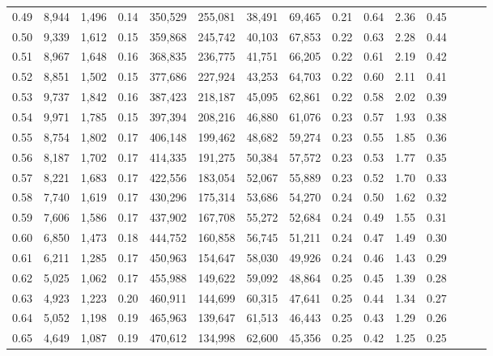 \begin{tabular}{rrrrrrrrrrrrrrr}
0.49 &   8,944 &  1,496 &  0.14 &  350,529 &  255,081 &   38,491 &   69,465 &  0.21 &  0.64 &  2.36 &      0.45 \\
0.50 &   9,339 &  1,612 &  0.15 &  359,868 &  245,742 &   40,103 &   67,853 &  0.22 &  0.63 &  2.28 &      0.44 \\
0.51 &   8,967 &  1,648 &  0.16 &  368,835 &  236,775 &   41,751 &   66,205 &  0.22 &  0.61 &  2.19 &      0.42 \\
0.52 &   8,851 &  1,502 &  0.15 &  377,686 &  227,924 &   43,253 &   64,703 &  0.22 &  0.60 &  2.11 &      0.41 \\
0.53 &   9,737 &  1,842 &  0.16 &  387,423 &  218,187 &   45,095 &   62,861 &  0.22 &  0.58 &  2.02 &      0.39 \\
0.54 &   9,971 &  1,785 &  0.15 &  397,394 &  208,216 &   46,880 &   61,076 &  0.23 &  0.57 &  1.93 &      0.38 \\
0.55 &   8,754 &  1,802 &  0.17 &  406,148 &  199,462 &   48,682 &   59,274 &  0.23 &  0.55 &  1.85 &      0.36 \\
0.56 &   8,187 &  1,702 &  0.17 &  414,335 &  191,275 &   50,384 &   57,572 &  0.23 &  0.53 &  1.77 &      0.35 \\
0.57 &   8,221 &  1,683 &  0.17 &  422,556 &  183,054 &   52,067 &   55,889 &  0.23 &  0.52 &  1.70 &      0.33 \\
0.58 &   7,740 &  1,619 &  0.17 &  430,296 &  175,314 &   53,686 &   54,270 &  0.24 &  0.50 &  1.62 &      0.32 \\
0.59 &   7,606 &  1,586 &  0.17 &  437,902 &  167,708 &   55,272 &   52,684 &  0.24 &  0.49 &  1.55 &      0.31 \\
0.60 &   6,850 &  1,473 &  0.18 &  444,752 &  160,858 &   56,745 &   51,211 &  0.24 &  0.47 &  1.49 &      0.30 \\
0.61 &   6,211 &  1,285 &  0.17 &  450,963 &  154,647 &   58,030 &   49,926 &  0.24 &  0.46 &  1.43 &      0.29 \\
0.62 &   5,025 &  1,062 &  0.17 &  455,988 &  149,622 &   59,092 &   48,864 &  0.25 &  0.45 &  1.39 &      0.28 \\
0.63 &   4,923 &  1,223 &  0.20 &  460,911 &  144,699 &   60,315 &   47,641 &  0.25 &  0.44 &  1.34 &      0.27 \\
0.64 &   5,052 &  1,198 &  0.19 &  465,963 &  139,647 &   61,513 &   46,443 &  0.25 &  0.43 &  1.29 &      0.26 \\
0.65 &   4,649 &  1,087 &  0.19 &  470,612 &  134,998 &   62,600 &   45,356 &  0.25 &  0.42 &  1.25 &      0.25 \\

\end{tabular}
